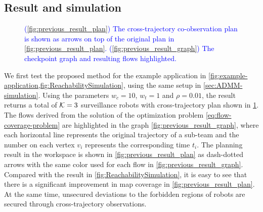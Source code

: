 \documentclass[10pt,twocolumn,twoside]{IEEEtran}
\newcommand{\new}[1]{\textcolor{blue}{#1}}
\begin{document}
\subsection{Result and simulation}

\begin{figure}
  \centering
  \caption{\new{(\ref{fig:previous_result_plan}) The cross-trajectory co-observation plan is shown as arrows on top of the original plan in \cref{fig:previous_result_plan}. (\ref{fig:previous_result_graph}) The checkpoint graph and resulting flows highlighted.}}
  \label{fig:3-team-ctco}
\end{figure}

We first test the proposed method for the example application in \cref{fig:example-application,fig:ReachabilitySimulation}, using the same setup in \cref{sec:ADMM-simulation}. Using the parameters $w_{c}=10$, $w_{t}=1$ and $\rho = 0.01$, the result returns a total of $\mathcal{K}=3$ surveillance robots with cross-trajectory plan shown in \cref{fig:3-team-ctco}. %
The flows derived from the solution of the optimization problem \eqref{eq:flow-coverage-problem} are highlighted in the graph \cref{fig:previous_result_graph}, where each horizontal line represents the original trajectory of a sub-team and the number on each vertex $v_{i}$ represents the corresponding time $t_{i}$. The planning result in the workspace is shown in \cref{fig:previous_result_plan} as dash-dotted arrows with the same color used for each flow in \cref{fig:previous_result_graph}. Compared with the result in \cref{fig:ReachabilitySimulation}, it is easy to see that there is a significant improvement in map coverage in \cref{fig:previous_result_plan}. At the same time, unsecured deviations to the forbidden regions of robots are secured through cross-trajectory observations. 
\end{document}

